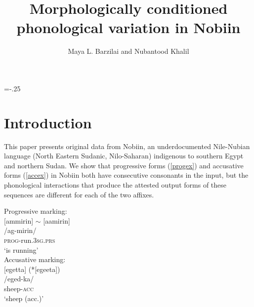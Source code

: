 \documentclass[output=paper]{langscibook}
\author{Maya L. Barzilai\affiliation{Georgetown University} and Nubantood Khalil\affiliation{Nubian Language Society}}
\title{Morphologically conditioned phonological variation in Nobiin}
\begin{document}
\multicolsep=-.25\baselineskip
\maketitle

\section{Introduction}

This paper presents original data from Nobiin, an underdocumented Nile-Nubian language (North Eastern Sudanic, Nilo-Saharan) indigenous to southern Egypt and northern Sudan. We show that progressive forms (\ref{progex}) and accusative forms (\ref{accex}) in Nobiin both have consecutive consonants in the input, but the phonological interactions that produce the attested output forms of these sequences are different for each of the two affixes.



\ea

\begin{multicols}{2}

\begin{xlist}
\ex Progressive marking: \label{progex}\\
 {}[ammirin] $\sim$ {}[aamirin]\\
/ag-mirin/\\
\textsc{prog}-run.\textsc{3sg.prs}\\
`is running'\\
\ex Accusative marking: \label{accex}\\
{}[egetta] (*{}[egeeta])\\
/eged-ka/\\
sheep-\textsc{acc}\\
`sheep (acc.)'\\

\end{xlist}

\end{multicols}

\z
\end{document}
